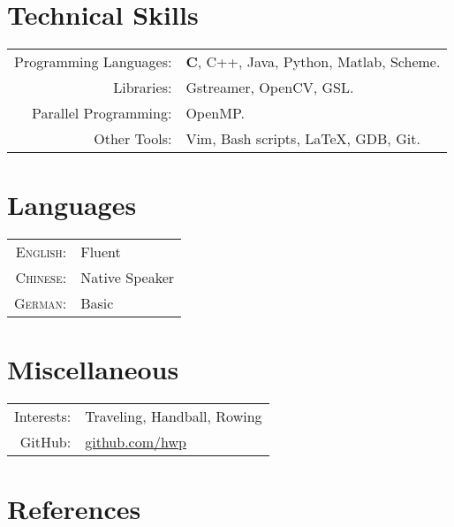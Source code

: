 \documentclass[a4paper,11pt]{article} %
\begin{document}

\section{Technical Skills}

\begin{tabular}{rl}
  Programming Languages: & \textbf{C}, C++, Java, Python, Matlab, Scheme. \\
  Libraries: & Gstreamer, OpenCV, GSL. \\
  Parallel Programming: & OpenMP. \\
  Other Tools: & Vim, Bash scripts, \LaTeX, GDB, Git. \\
\end{tabular}


\section{Languages}

\begin{tabular}{rl}
  \textsc{English:} & Fluent \\
  \textsc{Chinese:} & Native Speaker \\
  \textsc{German:} & Basic \\
\end{tabular}

\section{Miscellaneous}

\begin{tabular}{rl}
  Interests: & Traveling, Handball, Rowing \\
  GitHub: & \href{https://github.com/hwp}{github.com/hwp} \\
\end{tabular}

\iffalse
\section{References}
\end{document}
